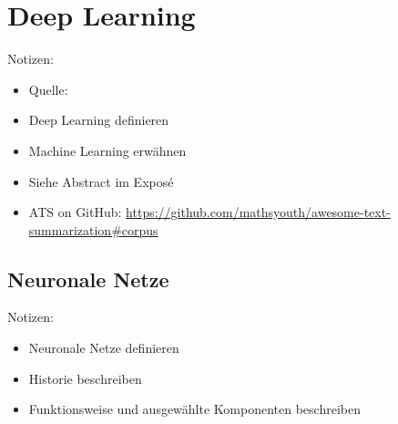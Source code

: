 \chapter{Deep Learning}
\thispagestyle{fancy}
\label{chap:Deep Learning}

Notizen:
\begin{itemize}
	\item Quelle: \cite{ZHA20}
	\item Deep Learning definieren
	\item Machine Learning erwähnen
	\item Siehe Abstract im Exposé
	\item ATS on GitHub: \url{https://github.com/mathsyouth/awesome-text-summarization#corpus}
\end{itemize}


\section{Neuronale Netze}
Notizen:
\begin{itemize}
	\item Neuronale Netze definieren
	\item Historie beschreiben
	\item Funktionsweise und ausgewählte Komponenten beschreiben
\end{itemize}


